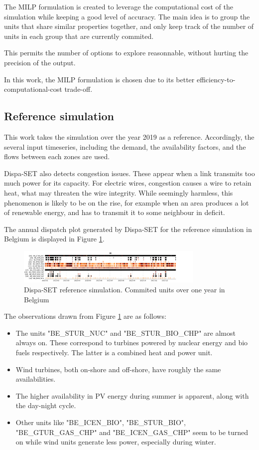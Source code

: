 The MILP formulation is created to leverage the computational cost of the simulation while keeping a good level of accuracy. The main idea is to group the units that share similar properties together, and only keep track of the number of units in each group that are currently commited.

This permits the number of options to explore reasonnable, without hurting the precision of the output.

In this work, the MILP formulation is chosen due to its better efficiency-to-computational-cost trade-off.

\subsection{Reference simulation \label{section:reference-simulation}}

This work takes the simulation over the year 2019 as a reference. Accordingly, the several input timeseries, including the demand, the availability factors, and the flows between each zones are used.

Dispa-SET also detects congestion issues. These appear when a link transmits too much power for its capacity. For electric wires, congestion causes a wire to retain heat, what may threaten the wire integrity. While seemingly harmless, this phenomenon is likely to be on the rise, for example when an area produces a lot of renewable energy, and has to transmit it to some neighbour in deficit.

The annual dispatch plot generated by Dispa-SET for the reference simulation in Belgium is displayed in Figure \ref{fig:dispatch-be}.

\begin{figure}[h]
    \centering
    \includegraphics[width=0.8\textwidth]{resources/images/commited-BE-year.png}
    \caption{Dispa-SET reference simulation. Commited units over one year in Belgium}
    \label{fig:dispatch-be}
\end{figure}

The observations drawn from Figure \ref{fig:dispatch-be} are as follows:
\begin{itemize}
    \item The units "BE\_STUR\_NUC" and "BE\_STUR\_BIO\_CHP" are almost always on. These correspond to turbines powered by nuclear energy and bio fuels respectively. The latter is a combined heat and power unit.
    \item Wind turbines, both on-shore and off-shore, have roughly the same availabilities.
    \item The higher availability in PV energy during summer is apparent, along with the day-night cycle.
    \item Other units like "BE\_ICEN\_BIO", "BE\_STUR\_BIO", "BE\_GTUR\_GAS\_CHP" and "BE\_ICEN\_GAS\_CHP" seem to be turned on while wind units generate less power, especially during winter.
\end{itemize}

